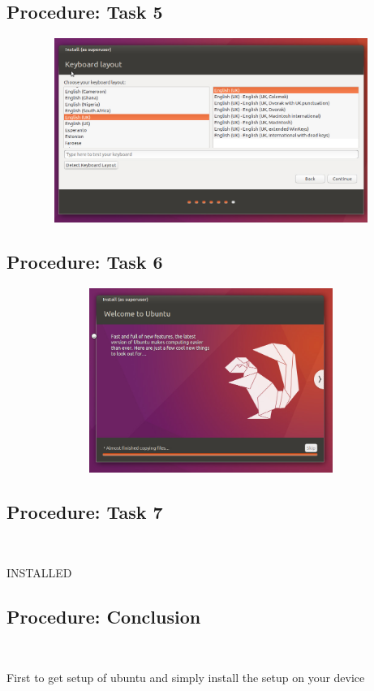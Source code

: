 \documentclass[11pt]{article}            %
\begin{document}
\subsection{Procedure: Task 5}     
\centering
  \includegraphics[width=24cm,height=6cm,keepaspectratio]{one.png}

\subsection{Procedure: Task 6}     
\centering
  \includegraphics[width=24cm,height=6cm,keepaspectratio]{six.png}

\subsection{Procedure: Task 7}    
    {\bfseries\Large
\centering
	 \ \

INSTALLED\\
	
	}    

\subsection{Procedure: Conclusion}    
    {\bfseries\Large
\centering
	 \ \

First to get setup of ubuntu and simply install the setup on your device\\
	
	}    
 
\end{document}
